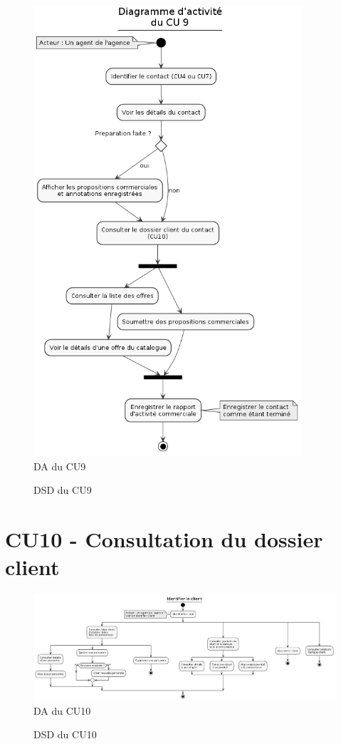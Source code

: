 \begin{figure}[H]
\centering
\includegraphics[width=10cm]{figures/DA_CU9.png}
\caption{DA du CU9}
\end{figure}

\begin{figure}[H]
\centering
\caption{DSD du CU9}
\end{figure}

\clearpage
\section{CU10 - Consultation du dossier client}
\begin{figure}[H]
\centering
\includegraphics[width=18cm, angle=90]{figures/DA_CU10.png}
\caption{DA du CU10}
\end{figure}

\begin{figure}[H]
\centering
\caption{DSD du CU10}
\end{figure}